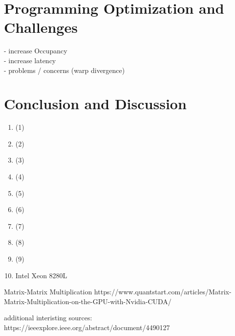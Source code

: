 \documentclass[a4paper,12pt]{llncs}
\numberwithin{equation}{section}
\begin{document}
\section{Programming Optimization and Challenges}
  - increase Occupancy\\
  - increase latency\\
  - problems / concerns (warp divergence)\\



\section{Conclusion and Discussion}

      


\begin{enumerate}
\item \cite{Rauber.2012} (1)
\item \cite{Lindholm.2008} (2)
\item \cite{Burgess.2020} (3)
\item \cite{Huang.2008} (4)
\item \cite{Bialas.2016} (5)
\item \cite{Khronos.2019} (6)
\item \cite{Wang.2019} (7)
\item \cite{NVIDIA.2018} (8)
\item \cite{NVIDIA.2019} (9)
\item Intel Xeon 8280L
\end{enumerate}

Matrix-Matrix Multiplication
https://www.quantstart.com/articles/Matrix-Matrix-Multiplication-on-the-GPU-with-Nvidia-CUDA/

additional interisting sources:
  https://ieeexplore.ieee.org/abstract/document/4490127




\newpage



\end{document}
